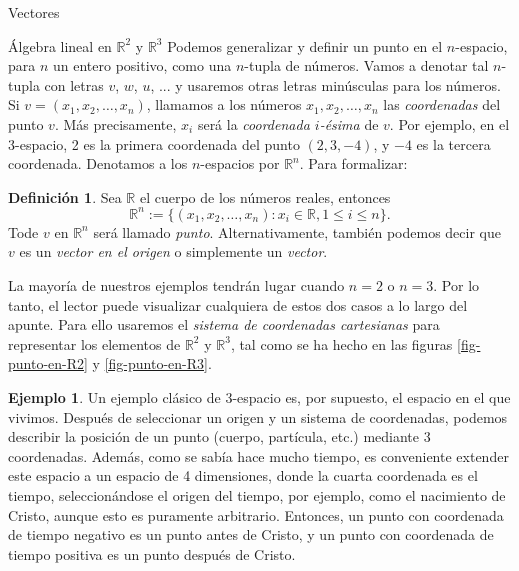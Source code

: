 \documentclass[a4paper,12pt,twoside,spanish]{amsbook}
\theoremstyle{definition}
\newtheorem{definicion}{Definici\'on}[section]
\newtheorem{ejemplo}{Ejemplo}[section]
\theoremstyle{remark}
\newcommand{\R}{\mathbb R}
\begin{document}
\begin{chapter}{Vectores}
\begin{section}{Álgebra lineal en $\R^2$ y $\R^3$}
		Podemos generalizar y definir un punto en el $n$-espacio, para $n$ un entero positivo, como una $n$-tupla de números. Vamos a denotar tal $n$-tupla con letras $v$, $w$, $u$, ... y usaremos otras letras minúsculas para los números. Si $v =(x_1,x_2,\ldots,x_n)$, llamamos a los números $x_1,x_2,\ldots,x_n$ las \textit{coordenadas} del punto $v$. Más precisamente, $x_i$ será la \textit{coordenada $i$-ésima} de $v$. Por ejemplo, en el 3-espacio, 2 es la primera coordenada del punto $(2,3, -4)$, y $-4$ es la tercera coordenada. Denotamos a los  $n$-espacios por $\R^n$. Para formalizar:
		\begin{definicion}
			Sea $\R$ el cuerpo de los números reales,  entonces
			\begin{equation*}
				\R^n:= \{(x_1,x_2,\ldots,x_n): x_i \in \R, 1 \le i \le n \}.
			\end{equation*}
			Tode $v$ en $\R^n$ será llamado {\em punto}. Alternativamente, también podemos decir que $v$  es un \textit{vector en el origen} o simplemente un \textit{vector}. 
		\end{definicion}
		
		La mayoría de nuestros ejemplos tendrán lugar cuando $n = 2$ o $n = 3$. Por lo tanto, el lector puede visualizar cualquiera de estos dos casos a lo largo del apunte. Para ello usaremos el {\em sistema  de coordenadas cartesianas} para representar los elementos de  $\R^2$ y  $\R^3$, tal como se ha hecho en las figuras \ref{fig-punto-en-R2} y \ref{fig-punto-en-R3}.
		
		
	
	
		\begin{ejemplo} \label{ej-3espacio-industria}
			Un ejemplo clásico de 3-espacio es, por supuesto, el espacio en el que vivimos. Después de seleccionar un origen y un sistema de coordenadas, podemos describir la posición de un punto (cuerpo, partícula, etc.) mediante 3 coordenadas. Además, como se sabía hace mucho tiempo, es conveniente extender este espacio a un espacio de 4 dimensiones, donde la cuarta coordenada es el tiempo, seleccionándose el origen del tiempo, por ejemplo, como el nacimiento de Cristo, aunque esto es puramente arbitrario. Entonces, un punto con coordenada de tiempo negativo es un punto antes de Cristo, y un punto con coordenada  de tiempo positiva es un punto después de Cristo.
			

\end{ejemplo}
\end{section}
\end{chapter}
\end{document}

